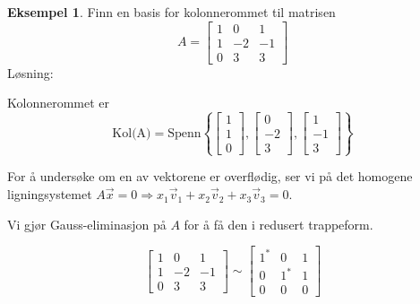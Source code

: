 \documentclass[11pt]{article}
\theoremstyle{definition}
\theoremstyle{definition}
\newtheorem{mitteks}{Eksempel}[section]
\theoremstyle{definition}
\theoremstyle{definition}
\theoremstyle{definition}
\theoremstyle{definition}
\begin{document}
		\begin{mitteks}
			Finn en basis for kolonnerommet til matrisen \[A=\left[\begin{array}{rrr} 
			1 & 0 & 1 \\
			1 & -2 & -1 \\
			0 & 3 & 3
			\end{array} \right]\]
			Løsning:
			
			Kolonnerommet er 
			\[\text{Kol(A)}=\text{Spenn}\left\lbrace 
			\left[\begin{array}{r} 
			1 \\
			1 \\
			0
			\end{array} \right],
			\left[\begin{array}{r} 
			0 \\
			-2 \\
			3
			\end{array} \right],
			\left[\begin{array}{r} 
			1 \\
			-1 \\
			3
			\end{array} \right]
			 \right\rbrace  \]
			 
			 For å undersøke om en av vektorene er overflødig, ser vi på det homogene ligningsystemet \(A\vec{x}=0 \Rightarrow x_1\vec{v}_1+x_2\vec{v}_2+x_3\vec{v}_3=0 \).
			 
			 Vi gjør Gauss-eliminasjon på \(A\) for å få den i redusert trappeform.
			 
			 \[\left[\begin{array}{rrr} 
			 1 & 0 & 1 \\
			 1 & -2 & -1 \\
			 0 & 3 & 3
			 \end{array} \right]\sim \left[\begin{array}{rrr} 
			 1^* & 0 & 1 \\
			 0 & 1^* & 1 \\
			 0 & 0 & 0
			 \end{array} \right] \]
			 

\end{mitteks}
\end{document}
